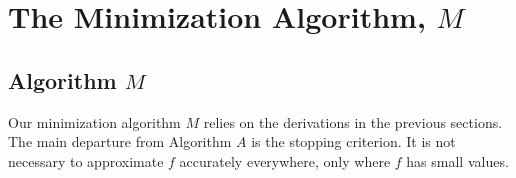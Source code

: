 \documentclass[review]{elsarticle}
\theoremstyle{definition}
\begin{document}
\section{The Minimization Algorithm, $M$} \label{sec:funmin}

\subsection{Algorithm $M$}  \label{sec:minalgo}

Our minimization algorithm $M$ relies on the derivations in the previous
sections. The main departure from Algorithm $A$ is the stopping criterion. It is
not necessary to approximate $f$ accurately everywhere, only where $f$ has small
values.
\end{document}

